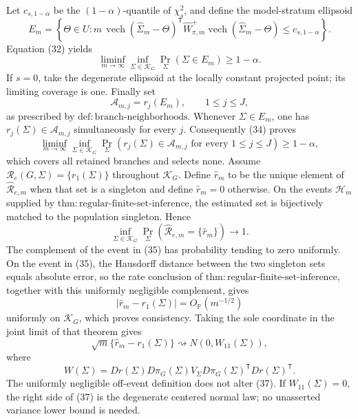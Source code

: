 Let \(c_{s,1-\alpha}\) be the \((1-\alpha)\)-quantile of \(\chi_s^2\), and define the model-stratum ellipsoid
\[
 E_m=\left\{\Theta\in U:
 m\,\operatorname{vech}(\widehat\Sigma_m-\Theta)^{\mathsf T}
 \widehat W_{\pi,m}^{+}
 \operatorname{vech}(\widehat\Sigma_m-\Theta)
 \leq c_{s,1-\alpha}\right\}.
\tag{33}
\]
Equation (32) yields
\[
 \liminf_{m\to\infty}\inf_{\Sigma\in\mathcal K_G}
 \Pr_\Sigma(\Sigma\in E_m)\geq1-\alpha.
\tag{34}
\]
If \(s=0\), take the degenerate ellipsoid at the locally constant projected point; its limiting coverage is one.  Finally set
\[
 \mathcal A_{m,j}=r_j(E_m),\qquad 1\leq j\leq J,
\]
as prescribed by \(\mathrm{def:branch\mbox{-}neighborhoods}\).  Whenever \(\Sigma\in E_m\), one has \(r_j(\Sigma)\in\mathcal A_{m,j}\) simultaneously for every \(j\).  Consequently (34) proves
\[
 \liminf_{m\to\infty}\inf_{\Sigma\in\mathcal K_G}
 \Pr_\Sigma\!\left(r_j(\Sigma)\in\mathcal A_{m,j}
 \text{ for every }1\leq j\leq J\right)
 \geq1-\alpha,
\]
which covers all retained branches and selects none.
Assume \(\mathcal R_e(G,\Sigma)=\{r_1(\Sigma)\}\) throughout \(\mathcal K_G\).  Define \(\widehat r_m\) to be the unique element of \(\widehat{\mathcal R}_{e,m}\) when that set is a singleton and define \(\widehat r_m=0\) otherwise.  On the events \(\mathcal H_m\) supplied by \(\mathrm{thm:regular\mbox{-}finite\mbox{-}set\mbox{-}inference}\), the estimated set is bijectively matched to the population singleton.  Hence
\[
 \inf_{\Sigma\in\mathcal K_G}
 \Pr_\Sigma\!\left(\widehat{\mathcal R}_{e,m}=\{\widehat r_m\}\right)
 \longrightarrow1.
\tag{35}
\]
The complement of the event in (35) has probability tending to zero uniformly.  On the event in (35), the Hausdorff distance between the two singleton sets equals absolute error, so the rate conclusion of \(\mathrm{thm:regular\mbox{-}finite\mbox{-}set\mbox{-}inference}\), together with this uniformly negligible complement, gives
\[
 |\widehat r_m-r_1(\Sigma)|=O_{\mathbb P}(m^{-1/2})
\tag{36}
\]
uniformly on \(\mathcal K_G\), which proves consistency.  Taking the sole coordinate in the joint limit of that theorem gives
\[
 \sqrt m\{\widehat r_m-r_1(\Sigma)\}
 \rightsquigarrow N(0,W_{11}(\Sigma)),
\tag{37}
\]
where
\[
 W(\Sigma)
 =Dr(\Sigma)D\pi_G(\Sigma)V_\Sigma
 D\pi_G(\Sigma)^{\mathsf T}Dr(\Sigma)^{\mathsf T}.
\tag{38}
\]
The uniformly negligible off-event definition does not alter (37).  If \(W_{11}(\Sigma)=0\), the right side of (37) is the degenerate centered normal law; no unasserted variance lower bound is needed.
